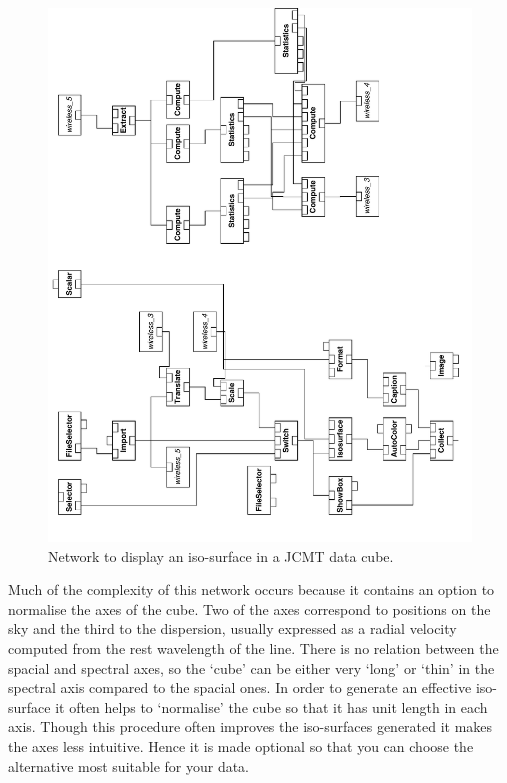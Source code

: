 \documentclass[twoside,11pt]{article}
\begin{document}
\begin{enumerate}
  \begin{figure}[htbp]

  \begin{center}
  \leavevmode
  \includegraphics[width=450pt]{sc2_jcmtsurface}
  \end{center}

  \caption[Network to display an iso-surface in a JCMT data cube.]
   {Network to display an iso-surface in a JCMT data cube.
   \label{JCMTSURFACE} }

  \end{figure}

   Much of the complexity of this network occurs because it contains an
   option to normalise the axes of the cube.  Two of the axes correspond
   to positions on the sky and the third to the dispersion, usually
   expressed as a radial velocity computed from the rest wavelength of
   the line.  There is no relation between the spacial and spectral
   axes, so the `cube' can be either very `long' or `thin' in the
   spectral axis compared to the spacial ones.  In order to generate
   an effective iso-surface it often helps to `normalise' the cube
   so that it has unit length in each axis.  Though this procedure
   often improves the iso-surfaces generated it makes the axes less
   intuitive.  Hence it is made optional so that you can choose the
   alternative most suitable for your data.


\end{enumerate}
\end{document}
